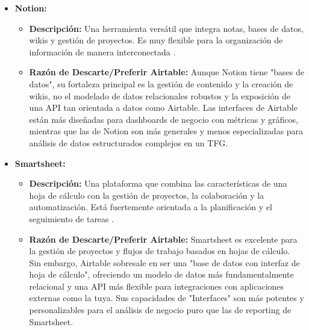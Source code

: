 \begin{enumerate}
\begin{itemize}
        \begin{itemize}

            \item \textbf{Notion:}
            \begin{itemize}
                \item \textbf{Descripción:} Una herramienta versátil que integra notas, bases de datos, wikis y gestión de proyectos. Es muy flexible para la organización de información de manera interconectada \cite{lodos2024notion}.
                \item \textbf{Razón de Descarte/Preferir Airtable:} Aunque Notion tiene "bases de datos", su fortaleza principal es la gestión de contenido y la creación de wikis, no el modelado de datos relacionales robustos y la exposición de una API tan orientada a datos como Airtable. Las interfaces de Airtable están más diseñadas para dashboards de negocio con métricas y gráficos, mientras que las de Notion son más generales y menos especializadas para análisis de datos estructurados complejos en un TFG.
            \end{itemize}

            \item \textbf{Smartsheet:}
            \begin{itemize}
                \item \textbf{Descripción:} Una plataforma que combina las características de una hoja de cálculo con la gestión de proyectos, la colaboración y la automatización. Está fuertemente orientada a la planificación y el seguimiento de tareas \cite{joinsecret2024airtable}.
                \item \textbf{Razón de Descarte/Preferir Airtable:} Smartsheet es excelente para la gestión de proyectos y flujos de trabajo basados en hojas de cálculo. Sin embargo, Airtable sobresale en ser una "base de datos con interfaz de hoja de cálculo", ofreciendo un modelo de datos más fundamentalmente relacional y una API más flexible para integraciones con aplicaciones externas como la tuya. Sus capacidades de "Interfaces" son más potentes y personalizables para el análisis de negocio puro que las de reporting de Smartsheet.
            \end{itemize}


\end{itemize}
\end{itemize}
\end{enumerate}
